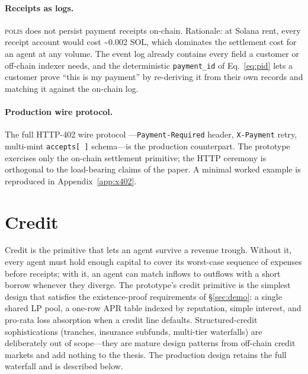 \documentclass[10pt,conference,letterpaper]{IEEEtran}
\theoremstyle{definition}
\newcommand{\polis}{\textsc{polis}\xspace}
\begin{document}
\paragraph{Receipts as logs.} \polis does not persist payment receipts
on-chain. Rationale: at Solana rent, every receipt account would cost
\textasciitilde 0.002 SOL, which dominates the settlement cost for an
agent at any volume. The event log already contains every field a
customer or off-chain indexer needs, and the deterministic
\texttt{payment\_id} of Eq.~\ref{eq:pid} lets a customer prove ``this
is my payment'' by re-deriving it from their own records and matching
it against the on-chain log.

\paragraph{Production wire protocol.} The full HTTP-402 wire protocol
\cite{x402spec}---\texttt{Payment-Required} header, \texttt{X-Payment}
retry, multi-mint \texttt{accepts[\,]} schema---is the production
counterpart. The prototype exercises only the on-chain settlement
primitive; the HTTP ceremony is orthogonal to the load-bearing claims
of the paper. A minimal worked example is reproduced in
Appendix~\ref{app:x402}.

\section{Credit}\label{sec:credit}

Credit is the primitive that lets an agent survive a revenue trough.
Without it, every agent must hold enough capital to cover its
worst-case sequence of expenses before receipts; with it, an agent can
match inflows to outflows with a short borrow whenever they diverge.
The prototype's credit primitive is the simplest design that satisfies
the existence-proof requirements of \S\ref{sec:demo}: a single shared
LP pool, a one-row APR table indexed by reputation, simple interest,
and pro-rata loss absorption when a credit line defaults.
Structured-credit sophistications (tranches, insurance subfunds,
multi-tier waterfalls) are deliberately out of scope---they are mature
design patterns from off-chain credit markets and add nothing to the
thesis. The production design retains the full waterfall and is
described below.
\end{document}
